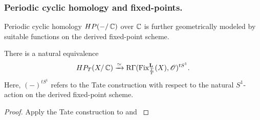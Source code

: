 \subsubsection{Periodic cyclic homology and fixed-points.}
Periodic cyclic homology $HP(-/\operatorname{\mathbb{C}})$ over $\operatorname{\mathbb{C}}$ is further geometrically modeled by suitable functions on the derived fixed-point scheme.
\begin{proposition}\label{proposition: periodic cyclic homology and derived fixed-point schemes}
There is a natural equivalence
    \begin{equation*}
        HP_T(X/\operatorname{\mathbb{C}}) \xrightarrow{\simeq} \operatorname{R\Gamma}(\operatorname{Fix}^{\mathbf{L}}_{\frac{T}{T}}(X), \operatorname{\mathscr{O}})^{tS^1}.
    \end{equation*}
Here, $(-)^{tS^1}$ refers to the Tate construction with respect to the natural $S^1$-action on the derived fixed-point scheme.
\end{proposition}
\begin{proof}
Apply the Tate construction to \cite[Discussion 1.12]{Low24} and \cite[Example 2.2.20]{Chen20}
\end{proof}







